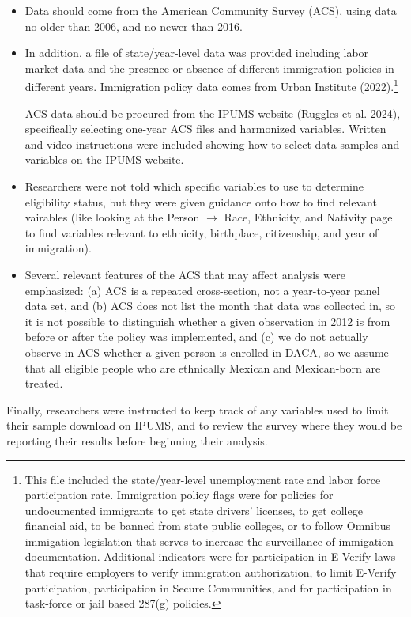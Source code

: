 \documentclass[
  letterpaper,
  DIV=11,
  numbers=noendperiod]{scrartcl}
\begin{document}
\begin{itemize}
\item
  Data should come from the American Community Survey (ACS), using data
  no older than 2006, and no newer than 2016.
\item
  In addition, a file of state/year-level data was provided including
  labor market data and the presence or absence of different immigration
  policies in different years. Immigration policy data comes from Urban
  Institute (2022).\footnote{This file included the state/year-level
    unemployment rate and labor force participation rate. Immigration
    policy flags were for policies for undocumented immigrants to get
    state drivers' licenses, to get college financial aid, to be banned
    from state public colleges, or to follow Omnibus immigation
    legislation that serves to increase the surveillance of immigation
    documentation. Additional indicators were for participation in
    E-Verify laws that require employers to verify immigration
    authorization, to limit E-Verify participation, participation in
    Secure Communities, and for participation in task-force or jail
    based 287(g) policies.}

  ACS data should be procured from the IPUMS website (Ruggles et al.
  2024), specifically selecting one-year ACS files and harmonized
  variables. Written and video instructions were included showing how to
  select data samples and variables on the IPUMS website.
\item
  Researchers were not told which specific variables to use to determine
  eligibility status, but they were given guidance onto how to find
  relevant vairables (like looking at the Person \(\rightarrow\) Race,
  Ethnicity, and Nativity page to find variables relevant to ethnicity,
  birthplace, citizenship, and year of immigration).
\item
  Several relevant features of the ACS that may affect analysis were
  emphasized: (a) ACS is a repeated cross-section, not a year-to-year
  panel data set, and (b) ACS does not list the month that data was
  collected in, so it is not possible to distinguish whether a given
  observation in 2012 is from before or after the policy was
  implemented, and (c) we do not actually observe in ACS whether a given
  person is enrolled in DACA, so we assume that all eligible people who
  are ethnically Mexican and Mexican-born are treated.
\end{itemize}

Finally, researchers were instructed to keep track of any variables used
to limit their sample download on IPUMS, and to review the survey where
they would be reporting their results before beginning their analysis.
\end{document}
